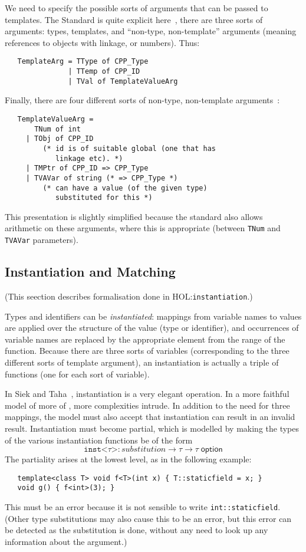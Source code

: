 \documentclass[11pt]{article}
\newcommand{\HOLfile}[1]{HOL:\texttt{#1}}
\begin{document}
We need to specify the possible sorts of arguments that can be passed
to templates.  The Standard is quite explicit
here~\cite[\S14.3~para~1]{cpp-standard-iso14882}, there are three
sorts of arguments: types, templates, and ``non-type, non-template''
arguments (meaning references to objects with linkage, or numbers).
Thus:
\begin{verbatim}
   TemplateArg = TType of CPP_Type
               | TTemp of CPP_ID
               | TVal of TemplateValueArg
\end{verbatim}
Finally, there are four different sorts of non-type, non-template
arguments~\cite[\S14.3.2~para~1]{cpp-standard-iso14882}:
\begin{verbatim}
   TemplateValueArg =
       TNum of int
     | TObj of CPP_ID
         (* id is of suitable global (one that has
            linkage etc). *)
     | TMPtr of CPP_ID => CPP_Type
     | TVAVar of string (* => CPP_Type *)
         (* can have a value (of the given type)
            substituted for this *)
\end{verbatim}
This presentation is slightly simplified because the standard also
allows arithmetic on these arguments, where this is appropriate
(between \texttt{TNum} and \texttt{TVAVar} parameters).

\subsection{Instantiation and Matching}

(This seection describes formalisation done in
\HOLfile{instantiation}.)

\medskip
\noindent Types and identifiers can be \emph{instantiated}: mappings
from variable names to values are applied over the structure of the
value (type or identifier), and occurrences of variable names are
replaced by the appropriate element from the range of the function.
Because there are three sorts of variables (corresponding to the three
different sorts of template argument), an instantiation is actually a
triple of functions (one for each sort of variable).

In Siek and Taha~\cite{DBLP:conf/ecoop/SiekT06}, instantiation is a
very elegant operation.  In a more faithful model of more of \cpp,
more complexities intrude.  In addition to the need for three
mappings, the model must also accept that instantiation can result in
an invalid result.  Instantiation must become partial, which is
modelled by making the types of the various instantiation functions be
of the form
\[
\texttt{inst<}\tau\texttt{>} : \mathit{substitution} \to \tau
\to \tau\;\textsf{option}
\]
The partiality arises at the lowest level, as in the following
example:
\begin{verbatim}
   template<class T> void f<T>(int x) { T::staticfield = x; }
   void g() { f<int>(3); }
\end{verbatim}
This must be an error because it is not sensible to write
\texttt{int::staticfield}.  (Other type substitutions may also cause
this to be an error, but this error can be detected as the
substitution is done, without any need to look up any information
about the argument.)
\end{document}
